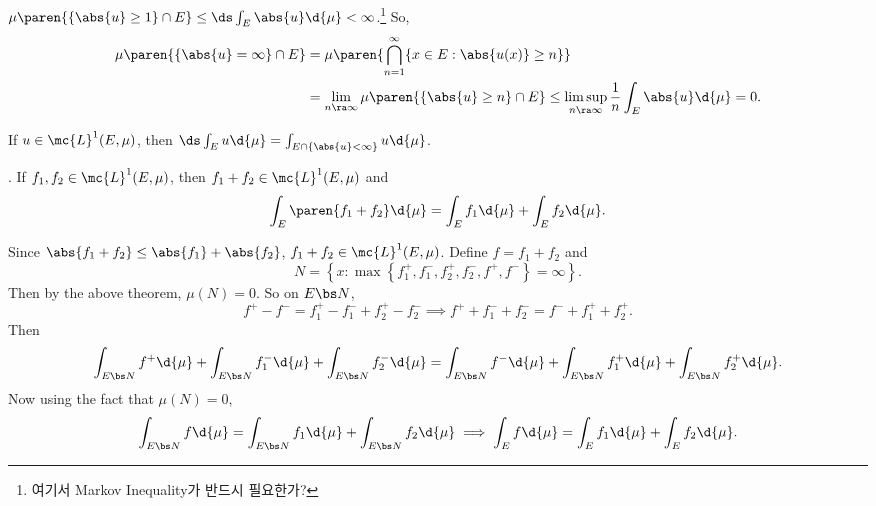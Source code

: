 \pf \(\mu\paren{\{\abs{u} \geq 1\}\cap E} \leq \ds \int_E \abs{u} \d{\mu} < \infty\).\footnote{여기서 Markov Inequality가 반드시 필요한가?} So,
\[
    \begin{aligned}
        \mu\paren{\{\abs{u} = \infty\} \cap E} & = \mu\paren{\bigcap_{n=1}^\infty \{x \in E : \abs{u(x)} \geq n\}}                                                            \\
                                               & = \lim_{n \ra \infty} \mu\paren{\{\abs{u} \geq n\} \cap E} \leq \limsup_{n\ra\infty} \frac{1}{n} \int_E \abs{u} \d{\mu} = 0.
    \end{aligned}
\]

\cor If \(u \in \mc{L}^{1}(E, \mu)\), then \(\ds \int_E u \d{\mu} = \int_{E \cap \{\abs{u} < \infty\}} u \d{\mu}\).

\thm. If \(f_1, f_2 \in \mc{L}^{1}(E, \mu)\), then \(f_1 + f_2 \in \mc{L}^{1}(E, \mu)\) and
\[
    \int_E \paren{f_1 + f_2} \d{\mu} = \int_E f_1 \d{\mu} + \int_E f_2 \d{\mu}.
\]

\pf Since \(\abs{f_1 + f_2} \leq \abs{f_1} + \abs{f_2}\), \(f_1+f_2 \in \mc{L}^{1}(E, \mu)\). Define \(f = f_1 + f_2\) and
\[
    N = \left\{x : \max\left\{f_1^+, f_1^-, f_2^+, f_2^-, f^+, f^-\right\} = \infty \right\}.
\]
Then by the above theorem, \(\mu(N) = 0\). So on \(E \bs N\),
\[
    f^+ - f^- = f_1^+ - f_1^- + f_2^+ - f_2^- \implies f^+ + f_1^- + f_2^- = f^- + f_1^+ + f_2^+.
\]
Then
\[
    \int_{E\bs N} f^+ \d{\mu} + \int_{E\bs N} f_1^- \d{\mu} + \int_{E\bs N} f_2^- \d{\mu} = \int_{E\bs N} f^-\d{\mu} + \int_{E\bs N} f_1^+\d{\mu} + \int_{E\bs N} f_2^+ \d{\mu}.
\]
Now using the fact that \(\mu(N) = 0\),
\[
    \int_{E \bs N} f \d{\mu} = \int_{E \bs N} f_1 \d{\mu} + \int_{E \bs N} f_2 \d{\mu} \implies \int_{E} f \d{\mu} = \int_{E} f_1 \d{\mu} + \int_{E} f_2 \d{\mu}.
\]
\pagebreak

